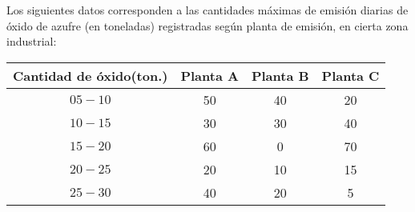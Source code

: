 
\addpoints
\question[12] 

Los siguientes datos corresponden a las cantidades máximas de emisión diarias de óxido de azufre (en toneladas) registradas según planta de emisión, en cierta zona industrial:
\begin{table}[h!]
    \centering
    \begin{tabular}{c|c|c|c} 
        Cantidad de óxido(ton.) & Planta A & Planta B & Planta C \\
        \hline $05-10$ & 50 & 40 & 20 \\
        $10-15$ & 30 & 30 & 40 \\
        $15-20$ & 60 & 0 & 70 \\
        $20-25$ & 20 & 10 & 15 \\
        $25-30$ & 40 & 20 & 5
        \end{tabular}
\end{table}

\noaddpoints


